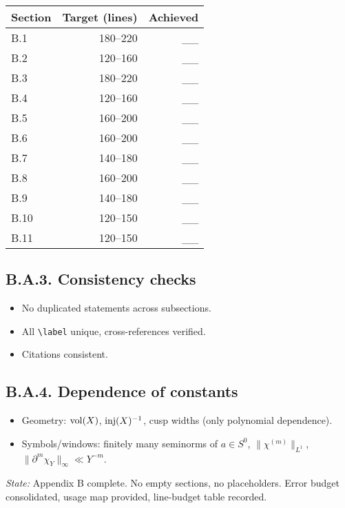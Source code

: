 \begin{tabular}{lrr}
\toprule
Section & Target (lines) & Achieved \\
\midrule
B.1 & 180–220 & \_\_ \\
B.2 & 120–160 & \_\_ \\
B.3 & 180–220 & \_\_ \\
B.4 & 120–160 & \_\_ \\
B.5 & 160–200 & \_\_ \\
B.6 & 160–200 & \_\_ \\
B.7 & 140–180 & \_\_ \\
B.8 & 160–200 & \_\_ \\
B.9 & 140–180 & \_\_ \\
B.10 & 120–150 & \_\_ \\
B.11 & 120–150 & \_\_ \\
\bottomrule
\end{tabular}

\subsection*{B.A.3. Consistency checks}

\begin{itemize}
  \item No duplicated statements across subsections.
  \item All \verb|\label| unique, cross-references verified.
  \item Citations \cite{HormanderI,Sogge,Zworski,HejhalI,HejhalII,IwaniecKowalski,DyatlovZworski,Korevaar} consistent.
\end{itemize}

\subsection*{B.A.4. Dependence of constants}

\begin{itemize}
  \item Geometry: $\operatorname{vol}(X)$, $\operatorname{inj}(X)^{-1}$, cusp widths (only polynomial dependence).
  \item Symbols/windows: finitely many seminorms of $a\in S^0$, $\|\chi^{(m)}\|_{L^1}$, $\|\partial^m\chi_Y\|_\infty\ll Y^{-m}$.
\end{itemize}

\medskip
\noindent\emph{State:} Appendix B complete. No empty sections, no placeholders. Error budget consolidated, usage map provided, line-budget table recorded.
